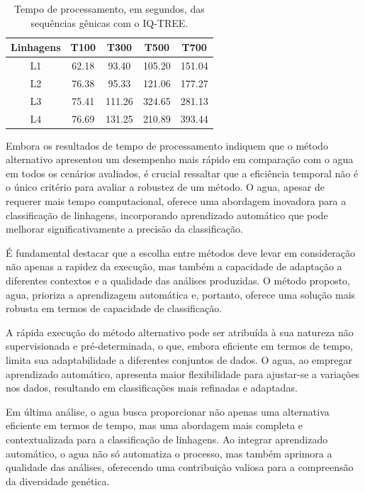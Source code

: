\begin{table}[htb]
  \caption{Tempo de processamento, em segundos, das sequências gênicas com o IQ-TREE.}
  \begin{center}
    \begin{tabular}{c|c|c|c|c}
      \hline
      Linhagens & T100  & T300   & T500   & T700   \\
      \hline
      L1        & 62.18 & 93.40  & 105.20 & 151.04 \\
      L2        & 76.38 & 95.33  & 121.06 & 177.27 \\
      L3        & 75.41 & 111.26 & 324.65 & 281.13 \\
      L4        & 76.69 & 131.25 & 210.89 & 393.44 \\
      \hline
    \end{tabular}
  \end{center}
  \label{tab:tempoProcessamentoIqtree}
\end{table}

Embora os resultados de tempo de processamento indiquem que o método alternativo apresentou um desempenho mais rápido em comparação com o \gls{agua} em todos os cenários avaliados, é crucial ressaltar que a eficiência temporal não é o único critério para avaliar a robustez de um método. O \gls{agua}, apesar de requerer mais tempo computacional, oferece uma abordagem inovadora para a classificação de linhagens, incorporando aprendizado automático que pode melhorar significativamente a precisão da classificação.

É fundamental destacar que a escolha entre métodos deve levar em consideração não apenas a rapidez da execução, mas também a capacidade de adaptação a diferentes contextos e a qualidade das análises produzidas. O método proposto, \gls{agua}, prioriza a aprendizagem automática e, portanto, oferece uma solução mais robusta em termos de capacidade de classificação.

A rápida execução do método alternativo pode ser atribuída à sua natureza não supervisionada e pré-determinada, o que, embora eficiente em termos de tempo, limita sua adaptabilidade a diferentes conjuntos de dados. O \gls{agua}, ao empregar aprendizado automático, apresenta maior flexibilidade para ajustar-se a variações nos dados, resultando em classificações mais refinadas e adaptadas.

Em última análise, o \gls{agua} busca proporcionar não apenas uma alternativa eficiente em termos de tempo, mas uma abordagem mais completa e contextualizada para a classificação de linhagens. Ao integrar aprendizado automático, o \gls{agua} não só automatiza o processo, mas também aprimora a qualidade das análises, oferecendo uma contribuição valiosa para a compreensão da diversidade genética.

